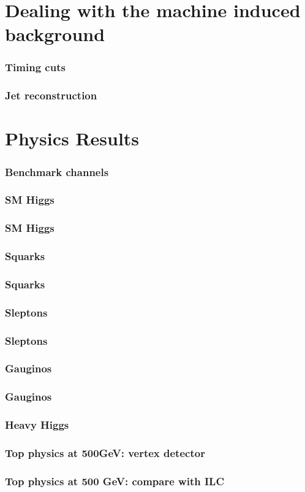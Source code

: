 \documentclass{beamer}
\begin{document}
\section[Bkg treatment]{Dealing with the machine induced background}
\begin{frame}
\frametitle{Timing cuts}
\end{frame}
\begin{frame}
\frametitle{Jet reconstruction}
\end{frame}

\section{Physics Results}
\begin{frame}
 \frametitle{Benchmark channels}
\end{frame}
\begin{frame}
\frametitle{SM Higgs}
\end{frame}
\begin{frame}
\frametitle{SM Higgs}
\end{frame}
\begin{frame}
\frametitle{Squarks}
\end{frame}
\begin{frame}
\frametitle{Squarks}
\end{frame}
\begin{frame}
\frametitle{Sleptons}
\end{frame}
\begin{frame}
\frametitle{Sleptons}
\end{frame}
\begin{frame}
\frametitle{Gauginos}
\end{frame}
\begin{frame}
\frametitle{Gauginos}
\end{frame}
\begin{frame}
\frametitle{Heavy Higgs}
\end{frame}
\begin{frame}
\frametitle{Top physics at 500GeV: vertex detector}
\end{frame}
\begin{frame}
\frametitle{Top physics at 500 GeV: compare with ILC}
\end{frame}
\end{document}
